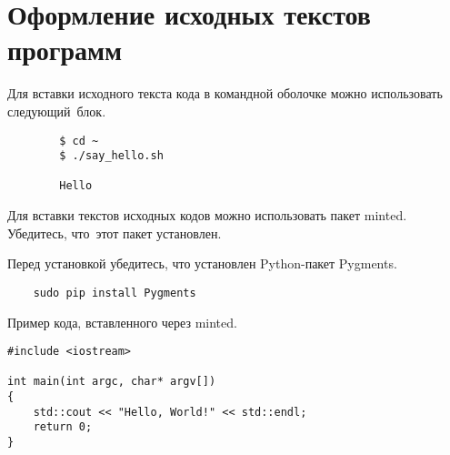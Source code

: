 \documentclass{scrartcl}
\begin{document}
\section{Оформление исходных текстов программ}
Для вставки исходного текста кода в командной оболочке можно использовать следующий\ 
блок.
\begin{commandline}
    \begin{verbatim}
        $ cd ~
        $ ./say_hello.sh

        Hello
    \end{verbatim}
\end{commandline}
Для вставки текстов исходных кодов можно использовать пакет minted. Убедитесь, что\ 
этот пакет установлен.

Перед установкой убедитесь, что установлен Python-пакет Pygments.
\begin{verbatim}
    sudo pip install Pygments
\end{verbatim}
Пример кода, вставленного через minted.
\begin{verbatim}
#include <iostream>

int main(int argc, char* argv[])
{
    std::cout << "Hello, World!" << std::endl;
    return 0;
}
\end{verbatim}
\end{document}
